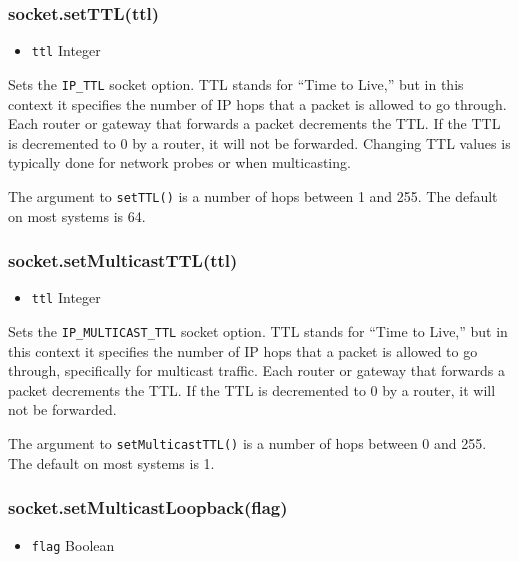 \subsubsection{socket.setTTL(ttl)}\label{socket.setttlttl}

\begin{itemize}
\itemsep1pt\parskip0pt
\item
  \texttt{ttl} Integer
\end{itemize}

Sets the \texttt{IP\_TTL} socket option. TTL stands for ``Time to
Live,'' but in this context it specifies the number of IP hops that a
packet is allowed to go through. Each router or gateway that forwards a
packet decrements the TTL. If the TTL is decremented to 0 by a router,
it will not be forwarded. Changing TTL values is typically done for
network probes or when multicasting.

The argument to \texttt{setTTL()} is a number of hops between 1 and 255.
The default on most systems is 64.

\subsubsection{socket.setMulticastTTL(ttl)}\label{socket.setmulticastttlttl}

\begin{itemize}
\itemsep1pt\parskip0pt
\item
  \texttt{ttl} Integer
\end{itemize}

Sets the \texttt{IP\_MULTICAST\_TTL} socket option. TTL stands for
``Time to Live,'' but in this context it specifies the number of IP hops
that a packet is allowed to go through, specifically for multicast
traffic. Each router or gateway that forwards a packet decrements the
TTL. If the TTL is decremented to 0 by a router, it will not be
forwarded.

The argument to \texttt{setMulticastTTL()} is a number of hops between 0
and 255. The default on most systems is 1.

\subsubsection{socket.setMulticastLoopback(flag)}\label{socket.setmulticastloopbackflag}

\begin{itemize}
\itemsep1pt\parskip0pt
\item
  \texttt{flag} Boolean
\end{itemize}

